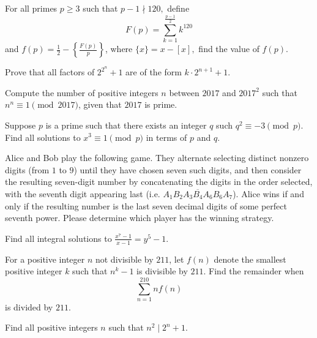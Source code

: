 \documentclass[mast]{lucky}
\begin{document}
\begin{req}{3}
For all primes $p \geq 3$ such that $p-1 \nmid 120,$ define $$F(p) = \sum^{\frac{p-1}{2}}_{k=1}k^{120}$$ and $f(p) = \frac{1}{2} - \left\{ \frac{F(p)}{p} \right\}$, where $\{x\} = x - [x],$ find the value of $f(p).$
\end{req}

\begin{prob}[Euler]{3}
Prove that all factors of $2^{2^{n}} + 1$ are of the form $k \cdot 2^{n+1} + 1.$
\end{prob}

\begin{prob}{3}
Compute the number of positive integers $n$ between $2017$ and $2017^2$ such that $n^n \equiv 1\pmod{2017}$, given that $2017$ is prime.
\end{prob}

\begin{req}[]{4}
Suppose $p$ is a prime such that there exists an integer $q$ such $q^2 \equiv -3 \pmod{p}.$ Find all solutions to $x^3 \equiv 1 \pmod{p}$ in terms of $p$ and $q.$
\end{req}

\begin{prob}{6}
Alice and Bob play the following game. They alternate selecting distinct nonzero digits (from $1$ to $9$) until they have chosen seven such digits, and then consider the resulting seven-digit number by concatenating the digits in the order selected, with the seventh digit appearing last (i.e. $\overline{A_1B_2A_3B_4A_6B_6A_7}$). Alice wins if and only if the resulting number is the last seven decimal digits of some perfect seventh power. Please determine which player has the winning strategy.
\end{prob}

\begin{prob}[ISL 2006/N5]{6}
Find all integral solutions to $\frac {x^{7} - 1}{x - 1} = y^{5} - 1.$
\end{prob}

\begin{prob}[DIME 2020/14]{6}
For a positive integer $n$ not divisible by $211$, let $f(n)$ denote the smallest positive integer $k$ such that $n^k - 1$ is divisible by $211$. Find the remainder when $$\sum_{n=1}^{210} nf(n)$$ is divided by $211$.
\end{prob}

\begin{prob}{9}
Find all positive integers $n$ such that $n^2 \mid 2^n+1.$
\end{prob}
\end{document}
